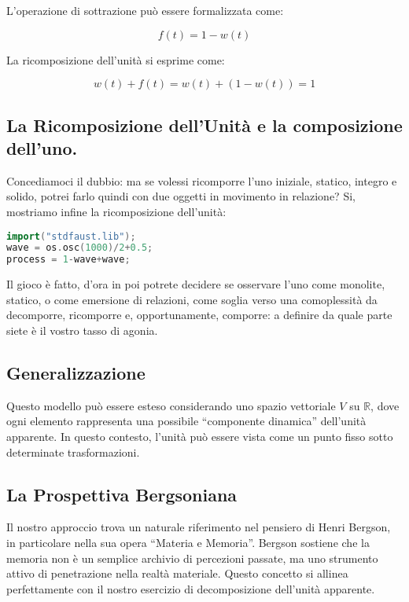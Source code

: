 \documentclass[a4paper,11pt]{article}
\begin{document}
L'operazione di sottrazione può essere formalizzata come:

\[f(t) = 1 - w(t)\]

La ricomposizione dell'unità si esprime come:

\[w(t) + f(t) = w(t) + (1 - w(t)) = 1\]

\subsection{La Ricomposizione dell'Unità e la composizione
dell'uno.}\label{la-ricomposizione-dellunituxe0-e-la-composizione-delluno.}

Concediamoci il dubbio: ma se volessi ricomporre l'uno iniziale,
statico, integro e solido, potrei farlo quindi con due oggetti in
movimento in relazione? Si, mostriamo infine la ricomposizione
dell'unità:

\begin{lstlisting}[language={C++}]
import("stdfaust.lib");
wave = os.osc(1000)/2+0.5;
process = 1-wave+wave;
\end{lstlisting}

Il gioco è fatto, d'ora in poi potrete decidere se osservare l'uno come
monolite, statico, o come emersione di relazioni, come soglia verso una
comoplessità da decomporre, ricomporre e, opportunamente, comporre: a
definire da quale parte siete è il vostro tasso di agonia.

\subsection{Generalizzazione}\label{generalizzazione}

Questo modello può essere esteso considerando uno spazio vettoriale
\(V\) su \(\mathbb{R}\), dove ogni elemento rappresenta una possibile
``componente dinamica'' dell'unità apparente. In questo contesto,
l'unità può essere vista come un punto fisso sotto determinate
trasformazioni.

\subsection{La Prospettiva
Bergsoniana}\label{la-prospettiva-bergsoniana}

Il nostro approccio trova un naturale riferimento nel pensiero di Henri
Bergson, in particolare nella sua opera ``Materia e Memoria''. Bergson
sostiene che la memoria non è un semplice archivio di percezioni
passate, ma uno strumento attivo di penetrazione nella realtà materiale.
Questo concetto si allinea perfettamente con il nostro esercizio di
decomposizione dell'unità apparente.
\end{document}
